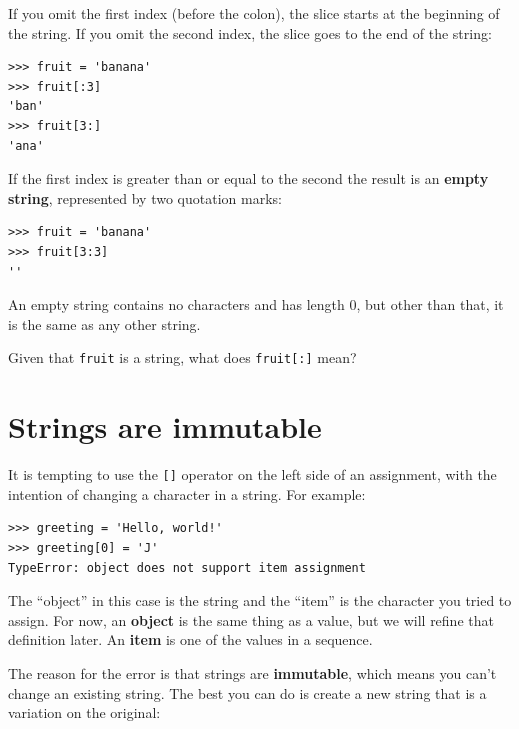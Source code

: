 \documentclass[10pt]{book}
\begin{document}
If you omit the first index (before the colon), the slice starts at
the beginning of the string.  If you omit the second index, the slice
goes to the end of the string:

\beforeverb
\begin{verbatim}
>>> fruit = 'banana'
>>> fruit[:3]
'ban'
>>> fruit[3:]
'ana'
\end{verbatim}
\afterverb
%
If the first index is greater than or equal to the second the result
is an {\bf empty string}, represented by two quotation marks:


\beforeverb
\begin{verbatim}
>>> fruit = 'banana'
>>> fruit[3:3]
''
\end{verbatim}
\afterverb
%
An empty string contains no characters and has length 0, but other
than that, it is the same as any other string.

\begin{ex}
Given that {\tt fruit} is a string, what does
{\tt fruit[:]} mean?



\end{ex}


\section{Strings are immutable}

It is tempting to use the {\tt []} operator on the left side of an
assignment, with the intention of changing a character in a string.
For example:


\beforeverb
\begin{verbatim}
>>> greeting = 'Hello, world!'
>>> greeting[0] = 'J'
TypeError: object does not support item assignment
\end{verbatim}
\afterverb
%
The ``object'' in this case is the string and the ``item'' is
the character you tried to assign.  For now, an {\bf object} is
the same thing as a value, but we will refine that definition
later.  An {\bf item} is one of the values in a sequence.


The reason for the error is that
strings are {\bf immutable}, which means you can't change an
existing string.  The best you can do is create a new string
that is a variation on the original:
\end{document}
